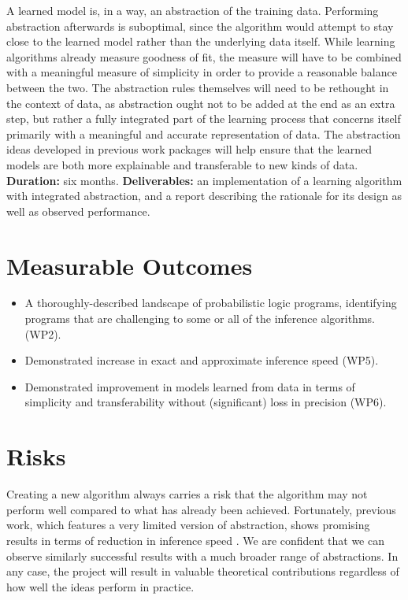 \documentclass{article}
\begin{document}
A learned model is, in a way, an abstraction of the training data. Performing
abstraction afterwards is suboptimal, since the algorithm would attempt to
stay close to the learned model rather than the underlying data itself. While
learning algorithms already measure goodness of fit, the measure will have to be
combined with a meaningful measure of simplicity in order to provide a
reasonable balance between the two. The abstraction rules themselves will need
to be rethought in the context of data, as abstraction ought not to be added at
the end as an extra step, but rather a fully integrated part of the learning
process that concerns itself primarily with a meaningful and accurate
representation of data. The abstraction ideas developed in previous work
packages will help ensure that the learned models are both more explainable and
transferable to new kinds of data. \textbf{Duration:} six months.
\textbf{Deliverables:} an implementation of a learning algorithm with integrated
abstraction, and a report describing the rationale for its design as well as
observed performance.

\section{Measurable Outcomes} \label{sec:7}

\begin{itemize}
\item A thoroughly-described landscape of probabilistic logic programs,
  identifying programs that are challenging to some or all of the inference
  algorithms. (WP2).
\item Demonstrated increase in exact and approximate inference speed (WP5).
\item Demonstrated improvement in models learned from data in terms of
  simplicity and transferability without (significant) loss in precision (WP6).
\end{itemize}

\section{Risks} \label{sec:8}

Creating a new algorithm always carries a risk that the algorithm may not
perform well compared to what has already been achieved. Fortunately, previous
work, which features a very limited version of abstraction, shows promising
results in terms of reduction in inference speed
\cite{DBLP:conf/icml/HoltzenBM18}. We are confident that we can observe
similarly successful results with a much broader range of abstractions. In any
case, the project will result in valuable theoretical contributions regardless
of how well the ideas perform in practice.
\end{document}
